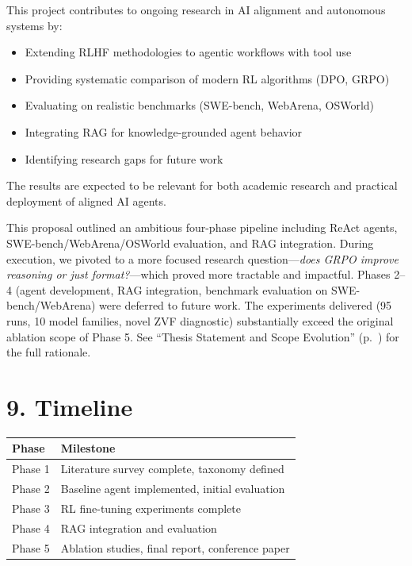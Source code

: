 \documentclass[12pt,a4paper]{report}
\theoremstyle{definition}
\begin{document}
This project contributes to ongoing research in AI alignment and autonomous systems by:
\begin{itemize}
    \item Extending RLHF methodologies to agentic workflows with tool use
    \item Providing systematic comparison of modern RL algorithms (DPO, GRPO)
    \item Evaluating on realistic benchmarks (SWE-bench, WebArena, OSWorld)
    \item Integrating RAG for knowledge-grounded agent behavior
    \item Identifying research gaps for future work
\end{itemize}

The results are expected to be relevant for both academic research and practical deployment of aligned AI agents.

\begin{tcolorbox}[colback=yellow!5!white, colframe=orange!70!black, title=\textbf{Scope Note (added at submission)}]
\small
This proposal outlined an ambitious four-phase pipeline including ReAct agents, SWE-bench/WebArena/OSWorld evaluation, and RAG integration. During execution, we pivoted to a more focused research question---\emph{does GRPO improve reasoning or just format?}---which proved more tractable and impactful. Phases 2--4 (agent development, RAG integration, benchmark evaluation on SWE-bench/WebArena) were deferred to future work. The experiments delivered (95 runs, 10 model families, novel ZVF diagnostic) substantially exceed the original ablation scope of Phase 5. See ``Thesis Statement and Scope Evolution'' (p.~\pageref{ch:thesis}) for the full rationale.
\end{tcolorbox}


\section*{9. Timeline}

\begin{table}[h]
\centering
\begin{tabular}{@{}ll@{}}
\toprule
\textbf{Phase} & \textbf{Milestone} \\
\midrule
Phase 1 & Literature survey complete, taxonomy defined \\
Phase 2 & Baseline agent implemented, initial evaluation \\
Phase 3 & RL fine-tuning experiments complete \\
Phase 4 & RAG integration and evaluation \\
Phase 5 & Ablation studies, final report, conference paper \\
\bottomrule
\end{tabular}
\end{table}
\end{document}
